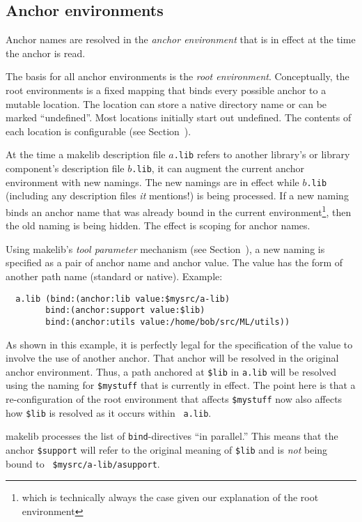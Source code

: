 \subsection{Anchor environments}
\label{sec:anchor:env}

Anchor names are resolved in the {\em anchor environment} that is in
effect at the time the anchor is read.

The basis for all anchor environments is the {\em root environment}.
Conceptually, the root environments is a fixed mapping that binds
every possible anchor to a mutable location.  The location can store a
native directory name or can be marked ``undefined''.  Most locations
initially start out undefined.  The contents of each location is
configurable (see Section~).

At the time a makelib description file $a${\tt .lib} refers to another
library's or library component's description file $b${\tt .lib}, it can
augment the current anchor environment with new namings.  The new
namings are in effect while $b${\tt .lib} (including any description
files {\it it}\/ mentions!) is being processed.  If a new naming
binds an anchor name that was already bound in the current
environment\footnote{which is technically always the case given our
explanation of the root environment}, then the old naming is being
hidden.  The effect is scoping for anchor names.

Using makelib's {\em tool parameter} mechanism (see
Section~), a new naming is specified as a pair of
anchor name and anchor value.  The value has the form of another path
name (standard or native). Example:

\begin{verbatim}
  a.lib (bind:(anchor:lib value:$mysrc/a-lib)
        bind:(anchor:support value:$lib)
        bind:(anchor:utils value:/home/bob/src/ML/utils))
\end{verbatim}

As shown in this example, it is perfectly legal for the specification
of the value to involve the use of another anchor.  That anchor will
be resolved in the original anchor environment. Thus, a path anchored
at {\tt \$lib} in {\tt a.lib} will be resolved using the naming for
{\tt \$mystuff} that is currently in effect.  The point here is that a
re-configuration of the root environment that affects {\tt \$mystuff}
now also affects how {\tt \$lib} is resolved as it occurs within {\tt
a.lib}.

makelib processes the list of {\tt bind}-directives ``in parallel.'' This
means that the anchor {\tt \$support} will refer to the original
meaning of {\tt \$lib} and is {\em not} being bound to {\tt
\$mysrc/a-lib/asupport}.

